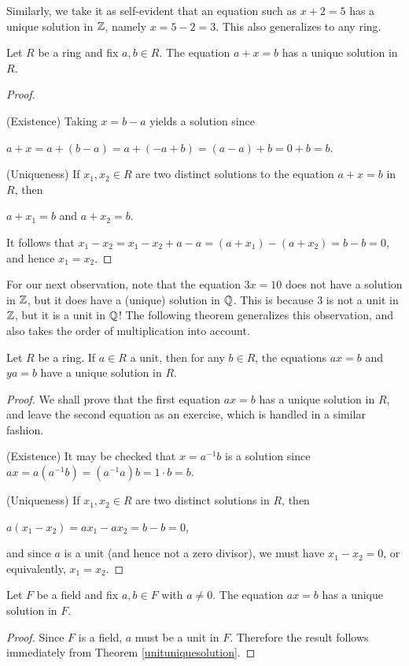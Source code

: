 \documentclass[11pt,fleqn,dvipsnames,usenames]{article}
\newcommand{\p}{\noindent}
\begin{document}
\p Similarly, we take it as self-evident that an equation such as $x + 2 = 5$ has a unique solution in $\mathbb{Z}$, namely $x = 5-2 = 3$.  This also generalizes to any ring.
%
\begin{theorem}
Let $R$ be a ring and fix $a,b\in R$.  The equation $a + x = b$ has a unique solution in $R$.
\end{theorem}
%
\begin{proof}~

\p (Existence) Taking $x = b - a$ yields a solution since
\begin{center}
$a + x = a + (b-a) = a + (-a + b) = (a - a) + b = 0 + b = b$.
\end{center}
\p (Uniqueness) If $x_{1},x_{2}\in R$ are two distinct solutions to the equation $a + x = b$ in $R$, then
\begin{center}
$a + x_{1} = b$ and $a + x_{2} = b$.
\end{center}
It follows that $x_{1} - x_{2} = x_{1} - x_{2} + a - a = (a+x_{1}) - (a+x_{2}) = b - b = 0$, and hence $x_{1} = x_{2}$.
\end{proof}
%
\p For our next observation, note that the equation $3x = 10$ does not have a solution in $\mathbb{Z}$, but it does have a (unique) solution in $\mathbb{Q}$.  This is because $3$ is not a unit in $\mathbb{Z}$, but it is a unit in $\mathbb{Q}$!  The following theorem generalizes this observation, and also takes the order of multiplication into account.
%
\begin{theorem}\label{unituniquesolution}
Let $R$ be a ring.  If $a\in R$ a unit, then for any $b\in R$, the equations $ax = b$ and $ya = b$ have a unique solution in $R$.
\end{theorem}
%
\begin{proof} We shall prove that the first equation $ax = b$ has a unique solution in $R$, and leave the second equation as an exercise, which is handled in a similar fashion.
\vsp

\p (Existence) It may be checked that $x = a^{-1}b$ is a solution since $ax = a(a^{-1}b) = (a^{-1}a)b = 1\cdot b = b$.
\vsp

\p (Uniqueness) If $x_{1},x_{2}\in R$ are two distinct solutions in $R$, then
\begin{center}
$a(x_{1} - x_{2}) = ax_{1} - ax_{2} = b - b = 0$,
\end{center}
and since $a$ is a unit (and hence not a zero divisor), we must have $x_{1} - x_{2} = 0$, or equivalently, $x_{1} = x_{2}$.
\end{proof}
%
\begin{corollary}
Let $F$ be a field and fix $a,b\in F$ with $a\neq 0$.  The equation $ax = b$ has a unique solution in $F$.
\end{corollary}
\begin{proof}
Since $F$ is a field, $a$ must be a unit in $F$.  Therefore the result follows immediately from Theorem \ref{unituniquesolution}.
\end{proof}
\end{document}
